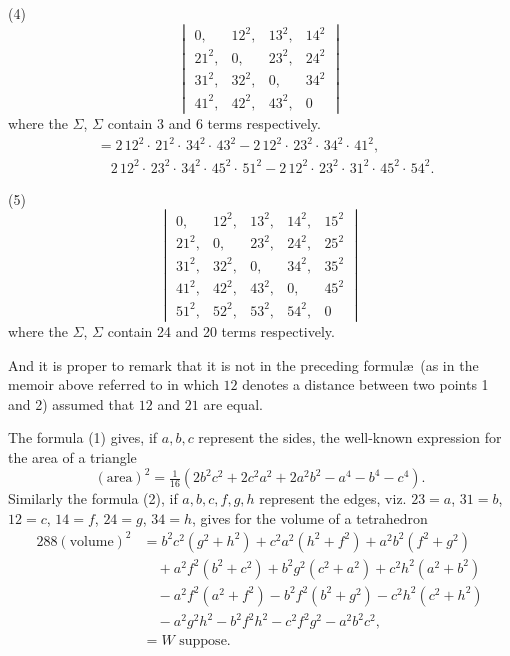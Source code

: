 \documentclass[11pt,a4paper]{article}
\theoremstyle{plain}
\begin{document}
(4)
\[
\begin{vmatrix}
0, & 12^2, & 13^2, & 14^2 \\
21^2, & 0, & 23^2, & 24^2 \\
31^2, & 32^2, & 0, & 34^2 \\
41^2, & 42^2, & 43^2, & 0
\end{vmatrix}
\]
where the $\Sigma$, $\Sigma$ contain 3 and 6 terms respectively.
\begin{align*}
&= 2\,12^2\cdot\,21^2\cdot\,34^2\cdot\,43^2 - 2\,12^2\cdot\,23^2\cdot\,34^2\cdot\,41^2,\\
&\quad 2\,12^2\cdot\,23^2\cdot\,34^2\cdot\,45^2\cdot\,51^2 - 2\,12^2\cdot\,23^2\cdot\,31^2\cdot\,45^2\cdot\,54^2.
\end{align*}

(5)
\[
\begin{vmatrix}
0, & 12^2, & 13^2, & 14^2, & 15^2 \\
21^2, & 0, & 23^2, & 24^2, & 25^2 \\
31^2, & 32^2, & 0, & 34^2, & 35^2 \\
41^2, & 42^2, & 43^2, & 0, & 45^2 \\
51^2, & 52^2, & 53^2, & 54^2, & 0
\end{vmatrix}
\]
where the $\Sigma$, $\Sigma$ contain 24 and 20 terms respectively.

And it is proper to remark that it is not in the preceding formul\ae\ (as in the memoir above referred to in which $12$ denotes a distance between two points 1 and 2) assumed that $12$ and $21$ are equal.

The formula (1) gives, if $a, b, c$ represent the sides, the well-known expression for the area of a triangle
\[
(\text{area})^2 = \tfrac{1}{16}(2b^2c^2 + 2c^2a^2 + 2a^2b^2 - a^4 - b^4 - c^4).
\]
Similarly the formula (2), if $a, b, c, f, g, h$ represent the edges, viz. $23 = a$, $31 = b$, $12 = c$, $14 = f$, $24 = g$, $34 = h$, gives for the volume of a tetrahedron
\begin{align*}
288(\text{volume})^2 &= b^2c^2(g^2 + h^2) + c^2a^2(h^2 + f^2) + a^2b^2(f^2 + g^2)\\
&\quad + a^2f^2(b^2 + c^2) + b^2g^2(c^2 + a^2) + c^2h^2(a^2 + b^2)\\
&\quad - a^2f^2(a^2 + f^2) - b^2f^2(b^2 + g^2) - c^2h^2(c^2 + h^2)\\
&\quad - a^2g^2h^2 - b^2f^2h^2 - c^2f^2g^2 - a^2b^2c^2,\\
&= W\text{ suppose}.
\end{align*}
\end{document}
